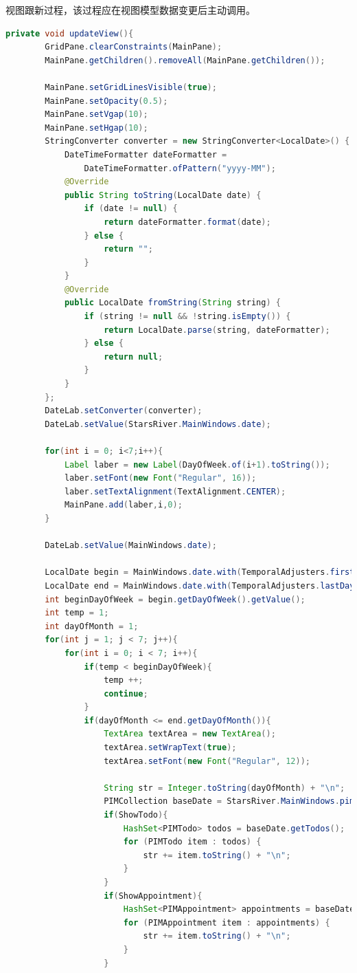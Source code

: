 \documentclass[a4paper]{article}
\begin{document}
    视图跟新过程，该过程应在视图模型数据变更后主动调用。
    \begin{lstlisting}[language=Java]
    private void updateView(){
        GridPane.clearConstraints(MainPane);
        MainPane.getChildren().removeAll(MainPane.getChildren());

        MainPane.setGridLinesVisible(true);
        MainPane.setOpacity(0.5);
        MainPane.setVgap(10);
        MainPane.setHgap(10);
        StringConverter converter = new StringConverter<LocalDate>() {
            DateTimeFormatter dateFormatter = 
                DateTimeFormatter.ofPattern("yyyy-MM");
            @Override
            public String toString(LocalDate date) {
                if (date != null) {
                    return dateFormatter.format(date);
                } else {
                    return "";
                }
            }
            @Override
            public LocalDate fromString(String string) {
                if (string != null && !string.isEmpty()) {
                    return LocalDate.parse(string, dateFormatter);
                } else {
                    return null;
                }
            }
        };  
        DateLab.setConverter(converter);
        DateLab.setValue(StarsRiver.MainWindows.date);

        for(int i = 0; i<7;i++){
            Label laber = new Label(DayOfWeek.of(i+1).toString());
            laber.setFont(new Font("Regular", 16));
            laber.setTextAlignment(TextAlignment.CENTER);
            MainPane.add(laber,i,0);
        }

        DateLab.setValue(MainWindows.date);

        LocalDate begin = MainWindows.date.with(TemporalAdjusters.firstDayOfMonth());
        LocalDate end = MainWindows.date.with(TemporalAdjusters.lastDayOfMonth());
        int beginDayOfWeek = begin.getDayOfWeek().getValue();
        int temp = 1;
        int dayOfMonth = 1;
        for(int j = 1; j < 7; j++){
            for(int i = 0; i < 7; i++){
                if(temp < beginDayOfWeek){
                    temp ++;
                    continue;
                }
                if(dayOfMonth <= end.getDayOfMonth()){
                    TextArea textArea = new TextArea();
                    textArea.setWrapText(true);
                    textArea.setFont(new Font("Regular", 12));

                    String str = Integer.toString(dayOfMonth) + "\n";
                    PIMCollection baseDate = StarsRiver.MainWindows.pimcollection.getItemsForDate(begin);
                    if(ShowTodo){
                        HashSet<PIMTodo> todos = baseDate.getTodos();
                        for (PIMTodo item : todos) {
                            str += item.toString() + "\n";
                        }
                    }
                    if(ShowAppointment){
                        HashSet<PIMAppointment> appointments = baseDate.getPIMAppointments();
                        for (PIMAppointment item : appointments) {
                            str += item.toString() + "\n";
                        }
                    }


\end{lstlisting}
\end{document}
